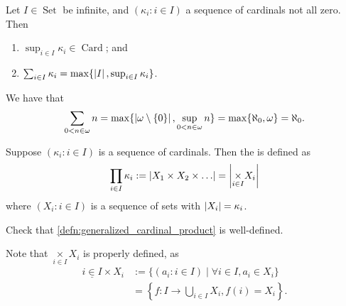 \documentclass[notoc,notitlepage]{tufte-book}
\DeclareMathOperator{\Card}{Card }
\DeclareMathOperator{\Set}{Set }
\begin{document}
\begin{thm}\label{thm:properties_of_cardinal_sum}
  Let $I \in \Set$ be infinite, and $(\kappa_i : i \in I)$ a sequence of cardinals not all zero. Then
  \begin{enumerate}
    \item $\sup_{i \in I} \kappa_i \in \Card$; and
    \item $\sum_{i \in I} \kappa_i = \max \{ \left|I\right|, \sup_{i \in I} \kappa_i \}$.
  \end{enumerate}
\end{thm}

\begin{eg}
  We have that
  \begin{equation*}
    \sum_{0 < n \in \omega} n = \max \{ \left|\omega \setminus \{0\}\right|, \sup_{0 < n \in \omega} n \} = \max \{ \aleph_0, \omega \} = \aleph_0.
  \end{equation*}
\end{eg}

\begin{defn}\label{defn:generalized_cardinal_product}
  Suppose $(\kappa_i : i \in I)$ is a sequence of cardinals. Then the  is defined as
  \begin{equation*}
    \prod_{i \in I} \kappa_i := \left| X_1 \times X_2 \times \ldots \right| = \left| \underset{i \in I}{\times} X_i \right|
  \end{equation*}
  where $(X_i : i \in I)$ is a sequence of sets with $\left|X_i\right| = \kappa_i$.
\end{defn}

\begin{ex}
  Check that \cref{defn:generalized_cardinal_product} is well-defined.
\end{ex}

\begin{note}
  Note that $\underset{i \in I}{\times} X_i$ is properly defined, as
  \begin{align*}
    \underset_{i \in I}{\times} X_i &:= \{ (a_i : i \in I) \mid \forall i \in I, a_i \in X_i \} \\
                                    &= \left\{ f : I \to \bigcup_{ i \in I } X_i, f(i) = X_i \right\}.
  \end{align*}
\end{note}
\end{document}

